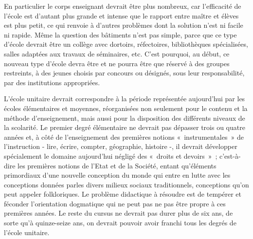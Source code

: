 \documentclass[french,twoside]{book} %
\begin{document}
En particulier le corps enseignant devrait être plus nombreux, car l’efficacité de l’école est d’autant plus grande et intense que le rapport entre maître et élèves est plus petit, ce qui renvoie à d’autres problèmes dont la solution n’est ni facile ni rapide. Même la question des bâtiments n’est pas simple, parce que ce type d’école devrait être un collège avec dortoirs, réfectoires, bibliothèques spécialisées, salles adaptées aux travaux de séminaires, etc. C'est pourquoi, au début, ce nouveau type d’école devra être et ne pourra être que réservé à des groupes restreints, à des jeunes choisis par concours ou désignés, sous leur responsabilité, par des institutions appropriées.\par
L'école unitaire devrait correspondre à la période représentée aujourd’hui par les écoles élémentaires et moyennes, réorganisées non seulement pour le contenu et la méthode d’enseignement, mais aussi pour la disposition des différents niveaux de la scolarité. Le premier degré élémentaire ne devrait pas dépasser trois ou quatre années et, à côté de l’enseignement des premières notions « instrumentales » de l’instruction - lire, écrire, compter, géographie, histoire -, il devrait développer spécialement le domaine aujourd’hui négligé des « droits et devoirs » ; c’est-à-dire les premières notions de l’Etat et de la Société, entant qu’éléments primordiaux d’une nouvelle conception du monde qui entre en lutte avec les conceptions données parles divers milieux sociaux traditionnels, conceptions qu’on peut appeler folkloriques. Le problème didactique à résoudre est de tempérer et féconder l’orientation dogmatique qui ne peut pas ne pas être propre à ces premières années. Le reste du cursus ne devrait pas durer plus de six ans, de sorte qu’à quinze-seize ans, on devrait pouvoir avoir franchi tous les degrés de l’école unitaire.\par
\end{document}
